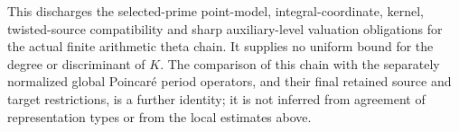 This discharges the selected-prime point-model, integral-coordinate,
kernel, twisted-source compatibility and sharp auxiliary-level valuation
obligations for the actual finite arithmetic theta chain.  It supplies no uniform bound for
the degree or discriminant of $K$.  The comparison of this chain
with the separately normalized global Poincar\'e period operators,
and their final retained source and target restrictions, is a further
identity; it is not inferred from agreement of representation types
or from the local estimates above.
